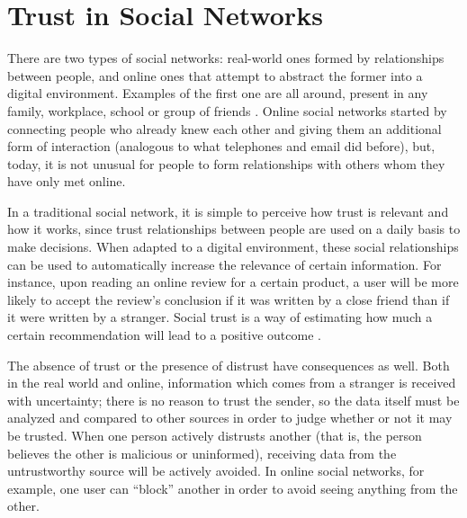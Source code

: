 
\section{Trust in Social Networks}
\label{section:trustsocial}
There are two types of social networks: real-world ones formed by relationships between people, and online ones that attempt to abstract the former into a digital environment.
Examples of the first one are all around, present in any family, workplace, school or group of friends \cite{newmannetworks}.
Online social networks started by connecting people who already knew each other and giving them an additional form of interaction (analogous to what telephones and email did before), but, today, it is not unusual for people to form relationships with others whom they have only met online. 

In a traditional social network, it is simple to perceive how trust is relevant and how it works, since trust relationships between people are used on a daily basis to make decisions.
When adapted to a digital environment, these social relationships can be used to automatically increase the relevance of certain information.
For instance, upon reading an online review for a certain product, a user will be more likely to accept the review's conclusion if it was written by a close friend than if it were written by a stranger.
Social trust is a way of estimating how much a certain recommendation will lead to a positive outcome \cite{golbeck2006inferring}. 

The absence of trust or the presence of distrust have consequences as well.
Both in the real world and online, information which comes from a stranger is received with uncertainty; there is no reason to trust the sender, so the data itself must be analyzed and compared to other sources in order to judge whether or not it may be trusted.
When one person actively distrusts another (that is, the person believes the other is malicious or uninformed), receiving data from the untrustworthy source will be actively avoided.
In online social networks, for example, one user can ``block'' another in order to avoid seeing anything from the other.

